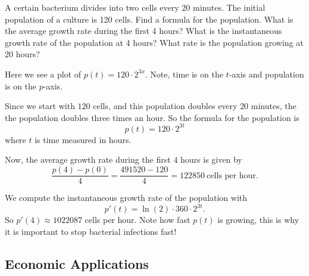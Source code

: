\begin{example}
A certain bacterium divides into two cells every 20 minutes. The
initial population of a culture is 120 cells. Find a formula for the
population.  What is the average growth rate during the first 4 hours?
What is the instantaneous growth rate of the population at 4 hours?
What rate is the population growing at 20 hours?
\end{example}
\begin{marginfigure}
\caption{Here we see a plot of $p(t) = 120\cdot 2^{3x}$. Note, time is on
  the $t$-axis and population is on the $p$-axis.}
\end{marginfigure}


\begin{solution}
Since we start with $120$ cells, and this population doubles every $20$
minutes, the the population doubles three times an hour. So the
formula for the population is
\[
p(t) = 120\cdot 2^{3t}
\]
where $t$ is time measured in hours.

Now, the average growth rate during the first $4$ hours is given by
\[
\frac{p(4)-p(0)}{4} =\frac{491520-120}{4} = 122850~\text{cells per hour.}
\]

We compute the instantaneous growth rate of the population with
\[
p'(t) = \ln(2)\cdot 360\cdot 2^{3t}.
\]
So $p'(4) \approx 1022087$ cells per hour. Note how fast $p(t)$ is
growing, this is why it is important to stop bacterial infections
fast!
\end{solution}


\subsection*{Economic Applications}

